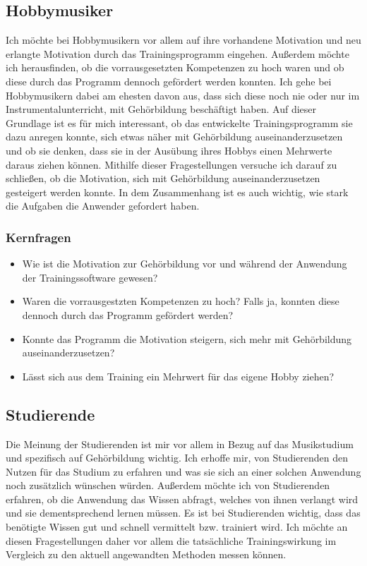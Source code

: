 \subsection{Hobbymusiker}
Ich möchte bei Hobbymusikern vor allem auf ihre vorhandene Motivation und neu erlangte Motivation durch das Trainingsprogramm eingehen. Außerdem möchte ich herausfinden, ob die vorrausgesetzten Kompetenzen zu hoch waren und ob diese durch das Programm dennoch gefördert werden konnten. Ich gehe bei Hobbymusikern dabei am ehesten davon aus, dass sich diese noch nie oder nur im Instrumentalunterricht, mit Gehörbildung beschäftigt haben. Auf dieser Grundlage ist es für mich interessant, ob das entwickelte Trainingsprogramm sie dazu anregen konnte, sich etwas näher mit Gehörbildung auseinanderzusetzen und ob sie denken, dass sie in der Ausübung ihres Hobbys einen Mehrwerte daraus ziehen können. Mithilfe dieser Fragestellungen versuche ich darauf zu schließen, ob die Motivation, sich mit Gehörbildung auseinanderzusetzen gesteigert werden konnte. In dem Zusammenhang ist es auch wichtig, wie stark die Aufgaben die Anwender gefordert haben.
\subsubsection*{Kernfragen}
\begin{itemize}
    \item Wie ist die Motivation zur Gehörbildung vor und während der Anwendung der Trainingssoftware gewesen?
    \item Waren die vorrausgestzten Kompetenzen zu hoch? Falls ja, konnten diese dennoch durch das Programm gefördert werden?
    \item Konnte das Programm die Motivation steigern, sich mehr mit Gehörbildung auseinanderzusetzen?
    \item Lässt sich aus dem Training ein Mehrwert für das eigene Hobby ziehen?
\end{itemize}
 
\subsection{Studierende}
Die Meinung der Studierenden ist mir vor allem in Bezug auf das Musikstudium und spezifisch auf Gehörbildung wichtig. Ich erhoffe mir, von Studierenden den Nutzen für das Studium zu erfahren und was sie sich an einer solchen Anwendung noch zusätzlich wünschen würden. Außerdem möchte ich von Studierenden erfahren, ob die Anwendung das Wissen abfragt, welches von ihnen verlangt wird und sie dementsprechend lernen müssen. Es ist bei Studierenden wichtig, dass das benötigte Wissen gut und schnell vermittelt bzw. trainiert wird. Ich möchte an diesen Fragestellungen daher vor allem die tatsächliche Trainingswirkung im Vergleich zu den aktuell angewandten Methoden messen können.
